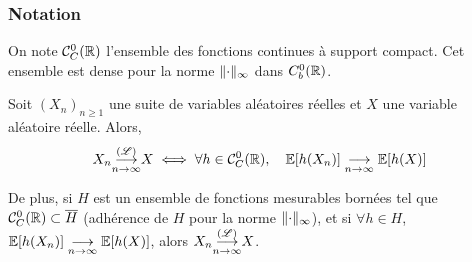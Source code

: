 \subsubsection*{Notation}

On note \(\mathcal C_C^0(\mathbb{R})\) l'ensemble des fonctions continues à support 
compact. Cet ensemble est dense pour la norme \(\mathopen{}\left\|\cdot\right\|\mathclose{}_{\infty}\) dans \(C_b^0(\mathbb{R})\).

\begin{proposition}
    Soit \({(X_n)}_{n\geq 1}\) une suite de variables aléatoires réelles
    et \(X\) une variable aléatoire réelle. Alors, 
    \begin{equation*}
        X_n\underset{n\to\infty}{{\overset{(\mathscr{L})}{\longrightarrow}}} X \iff \forall h\in \mathcal C_C^0(\mathbb{R}),\quad \mathbb{E}[h(X_n)] \underset{n\to\infty}{\longrightarrow} \mathbb{E}[h(X)]
    \end{equation*}

    De plus, si \(H\) est un ensemble de fonctions mesurables bornées tel que
    \(\mathcal C_C^0(\mathbb{R})\subset \overline{H}\) (adhérence de \(H\) pour la norme
    \(\mathopen{}\left\|\cdot\right\|\mathclose{}_{\infty}\)), et si \(\forall h\in H\), \(\mathbb{E}[h(X_n)] \underset{n\to\infty}{\longrightarrow} \mathbb{E}[h(X)]\),
    alors \(X_n\underset{n\to\infty}{{\overset{(\mathscr{L})}{\longrightarrow}}} X\).
\end{proposition}

